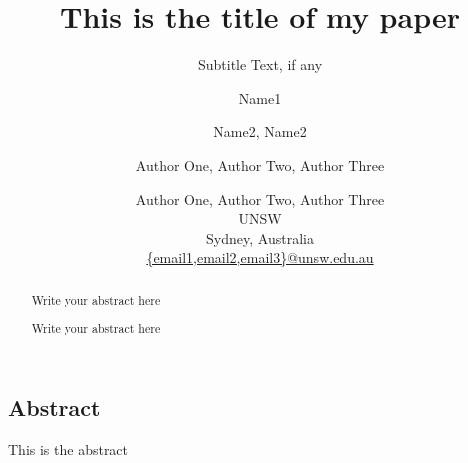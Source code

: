 \documentclass[10pt,conference,compsoc\ifDraft,draft\fi]{IEEEtran}
\begin{document}
\title{This is the title of my paper}
\ifACM
  \subtitle{Subtitle Text, if any}
  \author{Name1}
  \author{Name2, Name2}
\else\ifLNCS
\author{Author One, Author Two, Author Three}
\else\iftrue
  \author{Author One, Author Two, Author Three\\
    UNSW\\
    Sydney, Australia\\
    \href{mailto:first1.last1@unsw.edu.au}{\{email1,email2,email3\}@unsw.edu.au}
  }
\else
  \author{
    Leonid Ryzhyk\footnotemark[3]~\footnotemark[4] \quad
    Ihor Kuz\footnotemark[3]~\footnotemark[4] \quad
    Gernot Heiser\footnotemark[3]~\footnotemark[4]\\
    \footnotemark[3]~\affaddr{ACME~ ~ ~
      \footnotemark[4]~UNSW}\\
    \affaddr{Sydney, Australia}\\
    \email{Leonid.Ryzhyk@unsw.edu.au}
  }
\fi\fi\fi

\ifUsenix
  \maketitle
  \subsection*{Abstract}
  This is the abstract
\else\ifACM
  \begin{abstract}
    Write your abstract here
  \end{abstract}
  \maketitle
\else                           %
  \maketitle
  \thispagestyle{empty}
  \begin{abstract}
    Write your abstract here
  \end{abstract}
\fi\fi                          %
\ifFinal
  \pagestyle{empty}
\fi
\end{document}
